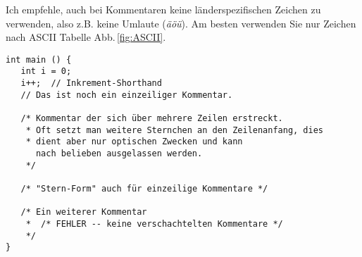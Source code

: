 Ich empfehle, auch bei Kommentaren keine länderspezifischen Zeichen zu verwenden, also z.B. keine Umlaute (\emph{äöü}). Am besten verwenden Sie nur Zeichen nach ASCII Tabelle Abb.\,\ref{fig:ASCII}.

\begin{codebox}
\begin{verbatim}
int main () {
   int i = 0;
   i++;  // Inkrement-Shorthand
   // Das ist noch ein einzeiliger Kommentar.

   /* Kommentar der sich über mehrere Zeilen erstreckt.
    * Oft setzt man weitere Sternchen an den Zeilenanfang, dies
    * dient aber nur optischen Zwecken und kann
      nach belieben ausgelassen werden.
    */

   /* "Stern-Form" auch für einzeilige Kommentare */

   /* Ein weiterer Kommentar
    *  /* FEHLER -- keine verschachtelten Kommentare */
    */
}
\end{verbatim}
\end{codebox}
